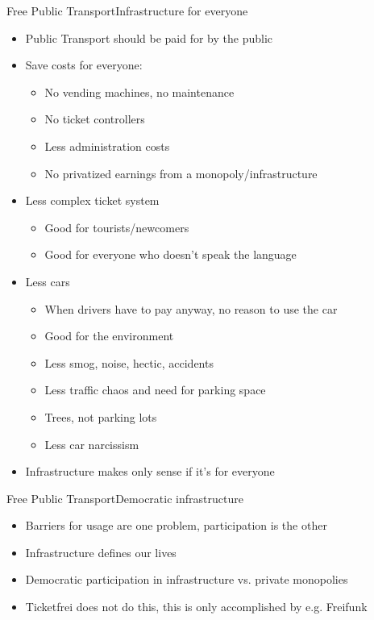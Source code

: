\documentclass[10pt]{beamer}
\begin{document}
{\begin{frame}{Free Public Transport}{Infrastructure for everyone}
  \begin{itemize}
    \item<1-> Public Transport should be paid for by the public
    \item<1-> Save costs for everyone:
    \begin{itemize}
    	\item<1-> No vending machines, no maintenance
    	\item<1-> No ticket controllers
    	\item<1-> Less administration costs
    	\item<1-> No privatized earnings from a monopoly/infrastructure
    \end{itemize}
    \item<2-> Less complex ticket system
    \begin{itemize}
    	\item<1-> Good for tourists/newcomers
    	\item<1-> Good for everyone who doesn't speak the language
    \end{itemize}
    \item<3-> Less cars
    \begin{itemize}
    	\item<1-> When drivers have to pay anyway, no reason to use the car
    	\item<1-> Good for the environment
    	\item<1-> Less smog, noise, hectic, accidents
    	\item<1-> Less traffic chaos and need for parking space
    	\item<1-> Trees, not parking lots
    	\item<1-> Less car narcissism
    \end{itemize}
  	\item<4-> Infrastructure makes only sense if it's for everyone
  \end{itemize}
\end{frame}

\begin{frame}{Free Public Transport}{Democratic infrastructure}

\begin{itemize}
    \item<1-> Barriers for usage are one problem, participation is the other
    \item<1-> Infrastructure defines our lives
    \item<1-> Democratic participation in infrastructure vs. private monopolies
	\item<1-> Ticketfrei does not do this, this is only accomplished by e.g. Freifunk
\end{itemize}
    


\end{frame}}
\end{document}

